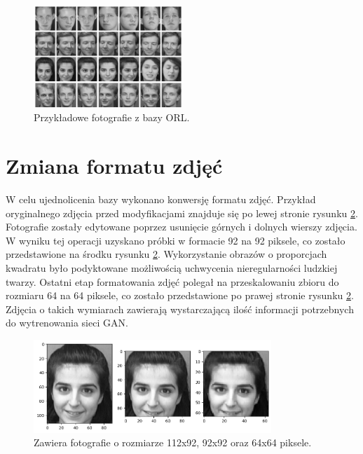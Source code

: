 \documentclass[eng,printmode]{mgr}
\begin{document}
 \begin{figure}[H]
	\centering
	\includegraphics[width=0.5\textwidth]{figures/ORL_dataset.png}
	\caption{Przykładowe fotografie z bazy ORL.}
	\label{fig:baza}
\end{figure}



\section{Zmiana formatu zdjęć}

W celu ujednolicenia bazy wykonano konwersję formatu zdjęć. Przykład oryginalnego zdjęcia przed modyfikacjami znajduje się po lewej stronie rysunku \ref{fig:konwersja}. Fotografie zostały edytowane poprzez usunięcie górnych i dolnych wierszy zdjęcia. W wyniku tej operacji uzyskano próbki w formacie 92 na 92 piksele, co zostało przedstawione na środku rysunku \ref{fig:konwersja}. Wykorzystanie obrazów o proporcjach kwadratu było podyktowane możliwością uchwycenia nieregularności ludzkiej twarzy. Ostatni etap formatowania zdjęć polegał na przeskalowaniu zbioru do rozmiaru 64 na 64 piksele, co zostało przedstawione po prawej stronie rysunku \ref{fig:konwersja}. Zdjęcia o takich wymiarach zawierają wystarczającą ilość informacji potrzebnych do wytrenowania sieci GAN. 

 \begin{figure}[H]
	\centering
	\includegraphics[width=0.8\textwidth]{figures/konwersja.png}
	\caption{Zawiera fotografie o rozmiarze 112x92, 92x92 oraz 64x64 piksele.}
	\label{fig:konwersja}
\end{figure}
\end{document}
